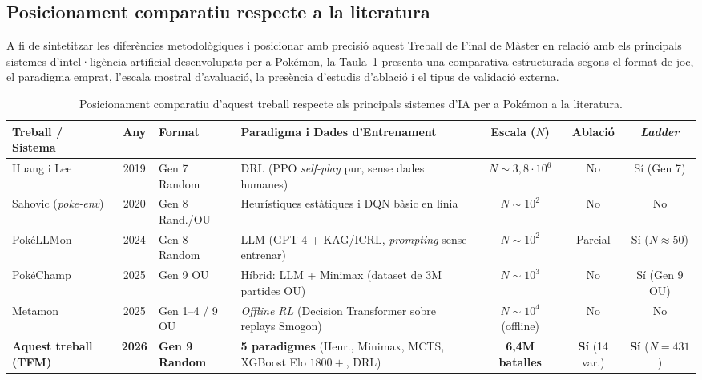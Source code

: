 \subsection{Posicionament comparatiu respecte a la literatura}
\label{subsec:posicionament_literatura}

A fi de sintetitzar les diferències metodològiques i posicionar amb precisió aquest Treball de Final de Màster en relació amb els principals sistemes d'intel·ligència artificial desenvolupats per a Pokémon, la Taula~\ref{tab:related_work_comparison} presenta una comparativa estructurada segons el format de joc, el paradigma emprat, l'escala mostral d'avaluació, la presència d'estudis d'ablació i el tipus de validació externa.

\begin{table}[htbp]
    \centering
    \caption{Posicionament comparatiu d'aquest treball respecte als principals sistemes d'IA per a Pokémon a la literatura.}
    \label{tab:related_work_comparison}
    \scriptsize
    \renewcommand{\arraystretch}{1.25}
    \setlength{\tabcolsep}{3.5pt}
    \begin{adjustbox}{max width=\textwidth}
    \begin{tabularx}{\textwidth}{@{} l c l >{\raggedright\arraybackslash}X c c c @{}}
        \toprule
        \textbf{Treball / Sistema} & \textbf{Any} & \textbf{Format} & \textbf{Paradigma i Dades d'Entrenament} & \textbf{Escala ($N$)} & \textbf{Ablació} & \textbf{\textit{Ladder}} \\
        \midrule
        Huang i Lee~\cite{pokemon_rl_huang} & 2019 & Gen 7 Random & DRL (PPO \emph{self-play} pur, sense dades humanes) & $N \sim 3{,}8\cdot 10^6$ & No & Sí (Gen 7) \\
        \arrayrulecolor{gray!30}\hline\arrayrulecolor{black}
        Sahovic (\textit{poke-env})~\cite{poke_env} & 2020 & Gen 8 Rand./OU & Heurístiques estàtiques i DQN bàsic en línia~\cite{dqn} & $N \sim 10^2$ & No & No \\
        \arrayrulecolor{gray!30}\hline\arrayrulecolor{black}
        PokéLLMon~\cite{pokellmon} & 2024 & Gen 8 Random & LLM (GPT-4 + KAG/ICRL, \emph{prompting} sense entrenar) & $N \sim 10^2$ & Parcial & Sí ($N \approx 50$) \\
        \arrayrulecolor{gray!30}\hline\arrayrulecolor{black}
        PokéChamp~\cite{pokechamp, pokechamp_icml} & 2025 & Gen 9 OU & Híbrid: LLM + Minimax (dataset de 3M partides OU) & $N \sim 10^3$ & No & Sí (Gen 9 OU) \\
        \arrayrulecolor{gray!30}\hline\arrayrulecolor{black}
        Metamon~\cite{grigsby_metamon} & 2025 & Gen 1--4 / 9 OU & \emph{Offline RL} (Decision Transformer sobre replays Smogon) & $N \sim 10^4$ (offline) & No & No \\
        \arrayrulecolor{gray!30}\hline\arrayrulecolor{black}
        \textbf{Aquest treball (TFM)} & \textbf{2026} & \textbf{Gen 9 Random} & \textbf{5 paradigmes} (Heur., Minimax, MCTS, XGBoost Elo $1800+$, DRL) & \textbf{6,4M batalles} & \textbf{Sí} (14 var.) & \textbf{Sí} ($N=431$) \\
        \bottomrule
    \end{tabularx}
    \end{adjustbox}
\end{table}

